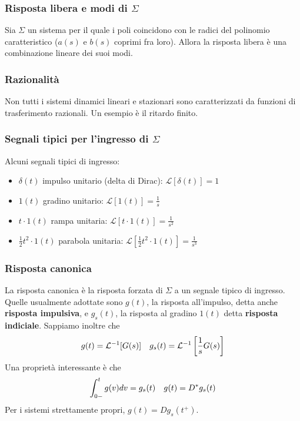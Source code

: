 \documentclass[11pt]{article}
\begin{document}
\subsubsection{Risposta libera e modi di $\Sigma$}
Sia $\Sigma$ un sistema per il quale i poli coincidono con le radici del polinomio caratteristico ($a(s)$ e $b(s)$ coprimi fra loro). Allora la risposta libera è una combinazione lineare dei suoi modi. 
\subsubsection{Razionalità}
Non tutti i sistemi dinamici lineari e stazionari sono caratterizzati da funzioni di trasferimento razionali. Un esempio è il ritardo finito.
\subsubsection{Segnali tipici per l'ingresso di $\Sigma$}
Alcuni segnali tipici di ingresso:
\begin{itemize}
    \item $\delta(t)$ impulso unitario (delta di Dirac): $\mathcal{L}[\delta (t)] = 1$
    \item $1(t)$ gradino unitario: $\mathcal{L}[1(t)] = \frac{1}{s}$
    \item $t\cdot 1(t)$ rampa unitaria: $\mathcal{L}[t\cdot 1(t)] = \frac{1}{s^2}$
    \item $\frac{1}{2}t^2 \cdot 1(t)$ parabola unitaria: $\mathcal{L}\left[\frac{1}{2}t^2 \cdot 1(t)\right] = \frac{1}{s^3}$
\end{itemize}
\subsubsection{Risposta canonica}
La risposta canonica è la risposta forzata di $\Sigma$ a un segnale tipico di ingresso. Quelle usualmente adottate sono $g(t)$, la risposta all'impulso, detta anche \textbf{risposta impulsiva}, e $g_s(t)$, la risposta al gradino $1(t)$ detta \textbf{risposta indiciale}. Sappiamo inoltre che 
\begin{displaymath}
    g(t) = \mathcal{L}^{-1}[G(s)] \hspace{10px} g_s(t) = \mathcal{L}^{-1}\left[\frac{1}{s}G(s)\right]
\end{displaymath}
Una proprietà interessante è che
\begin{displaymath}
    \int_{0-}^t g(v) dv = g_s(t) \hspace{10px} g(t)=D^* g_s (t)
\end{displaymath}
Per i sistemi strettamente propri, $g(t) = Dg_s(t^+)$.
\end{document}
